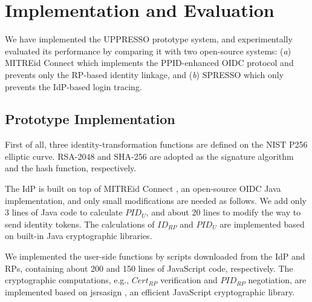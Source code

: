 \section{Implementation and Evaluation}
\label{sec:implementation}
We have implemented the UPPRESSO prototype system, and experimentally evaluated its performance
 by comparing it with two open-source systems:
  (\emph{a}) MITREid Connect \cite{MITREid}
    which implements the PPID-enhanced OIDC protocol and prevents only the RP-based identity linkage,
     and (\emph{b}) SPRESSO \cite{SPRESSO} which only prevents the IdP-based login tracing.

\subsection{Prototype Implementation}
First of all, three identity-transformation functions are defined on
        the NIST P256 elliptic curve.
RSA-2048 and SHA-256 are adopted as the signature algorithm and the hash function, respectively.

The IdP is built on top of MITREid Connect \cite{MITREid},
    an open-source OIDC Java implementation, %
    and only small modifications are needed as follows.
We add only 3 lines of Java code to calculate $PID_U$,
    and about 20 lines to modify the way to send identity tokens.
The calculations of $ID_{RP}$ and $PID_U$ are implemented based on built-in Java cryptographic libraries. %

We implemented the user-side functions by scripts downloaded from the IdP and RPs,
     containing about 200 and 150 lines of JavaScript code, respectively.
The cryptographic computations, e.g., $Cert_{RP}$ verification and $PID_{RP}$ negotiation, are implemented based on jsrsasign \cite{jsrsasign}, an efficient JavaScript cryptographic library.

